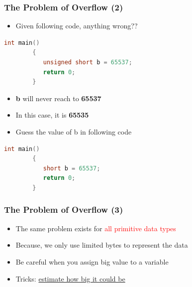 \begin{frame}[fragile]
	\frametitle{The Problem of Overflow (2)}
\begin{itemize}
	\item {Given following code, anything wrong??}
\end{itemize}
		\begin{lstlisting}[numbers=none, language=c,frame=none]
	    int main()
	    {
	       unsigned short b = 65537;
	       return 0;
	    }
	\end{lstlisting}
	\vspace{-0.15in}
	\begin{itemize}
		\item {\textbf{b} will never reach to \textbf{65537}}
		\item {In this case, it is \textbf{65535}}
		\item {Guess the value of b in following code}
	\end{itemize}
		\begin{lstlisting}[numbers=none, language=c,frame=none]
	    int main()
	    {
	       short b = 65537;
	       return 0;
	    }
	\end{lstlisting}
\end{frame}

\begin{frame}[fragile]
	\frametitle{The Problem of Overflow (3)}
	\begin{itemize}
		\item {The same problem exists for \textcolor{red}{all primitive data types}}
		\item {Because, we only use limited bytes to represent the data}
		\item {Be careful when you assign big value to a variable}
		\item {Tricks: \underline{estimate how big it could be}}
	\end{itemize}

\end{frame}

